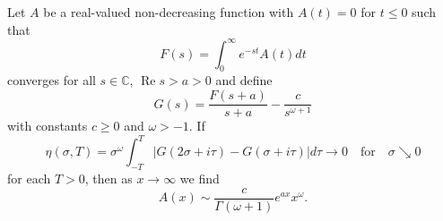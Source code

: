 \begin{thm}
\label{thm:ikehara}
Let $A$ be a real-valued non-decreasing function with $A(t) = 0$ for $t \leq 0$ such that
\begin{equation}
\label{eq:integraltransform}
    F(s) = \int_0^\infty e^{-s t} A(t) dt
\end{equation}
converges for all $s \in \mathbb{C}$, $\operatorname{Re} s > a > 0$ and define
\begin{equation*}
    G(s) = \frac{F(s+a)}{s+a} - \frac{c}{s^{\omega + 1}}
\end{equation*}
with constants $c \geq 0$ and $\omega > -1$. If 
\begin{equation}
\label{eq:abszissasmall}
    \eta(\sigma, T) = \sigma^\omega \int_{-T}^{T} |G(2\sigma + i\tau) - G(\sigma + i\tau)| d\tau \to 0 \quad \text{for} \quad \sigma \searrow 0
\end{equation}
for each $T > 0$, then as $x \to \infty$ we find
\begin{equation*}
    A(x) \sim \frac{c}{\Gamma(\omega + 1)} e^{a x} x^\omega.
\end{equation*}
\end{thm}


